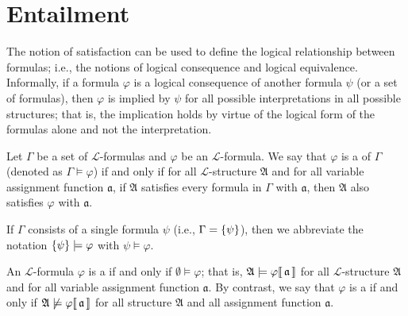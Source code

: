 \newpage
\section{Entailment}
\noindent
The notion of satisfaction can be used to define the logical relationship between formulas; i.e., the notions of
logical consequence and logical equivalence.
Informally, if a formula \( \varphi \) is a logical consequence of another formula \( \psi \) (or a set of formulas), then \( \varphi \)
is implied by \( \psi \) for all possible interpretations in all possible structures; that is, the implication holds by virtue of the logical form of the formulas alone and
not the interpretation.

\begin{dfn}
     \label{dfn:first-order-language-logical-consequence}
    Let \( \Gamma \) be a set of \( \mathcal{L} \)-formulas and \( \varphi \) be an \( \mathcal{L} \)-formula.
    We say that \( \varphi \) is a  of \( \Gamma \) (denoted as \( \Gamma \models \varphi \))
    if and only if for all \( \mathcal{L} \)-structure \( \mathfrak{A} \) and for all variable assignment function \( \mathfrak{a} \),
    if \( \mathfrak{A} \) satisfies every formula in \( \Gamma \) with \( \mathfrak{a} \), then \( \mathfrak{A} \) also satisfies \( \varphi \) with \( \mathfrak{a} \).
\end{dfn}

\begin{notation}
    If \( \Gamma \) consists of a single formula \( \psi \) (i.e., \( \Gamma = \mleft\{ \psi \mright\} \)), then we abbreviate the notation
    \( \mleft\{ \psi \mright\} \models \varphi \) with \( \psi \models \varphi \).
\end{notation}

\begin{dfn}[Tautology]
     \label{dfn:first-order-language-tautology}
    An \( \mathcal{L} \)-formula \( \varphi \) is a  if and only if \( \emptyset \models \varphi \);
    that is, \(  \mathfrak{A} \models \varphi\llbracket\, \mathfrak{a} \,\rrbracket \) for all \( \mathcal{L} \)-structure \( \mathfrak{A} \)
    and for all variable assignment function \( \mathfrak{a} \).
    By contrast, we say that \( \varphi \) is a  if and only if \(  \mathfrak{A} \not\models \varphi\llbracket\,\mathfrak{a} \,\rrbracket \)
    for all structure \( \mathfrak{A} \) and all assignment function \( \mathfrak{a} \).
\end{dfn}


